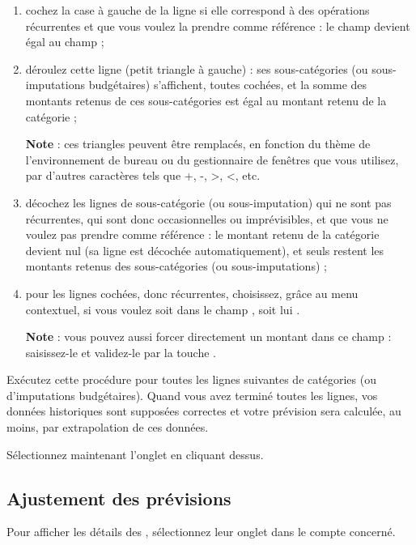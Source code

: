 \begin{enumerate}
	\item cochez la case à gauche de la ligne si elle correspond à des opérations récurrentes et que vous voulez la prendre comme référence : le champ  devient égal au champ  ;
	\item déroulez cette ligne (petit triangle à gauche) : ses sous-catégories (ou sous-imputations budgétaires) s'affichent, toutes cochées, et la somme des montants retenus de ces sous-catégories est égal au montant retenu de la catégorie ;

	\textbf{Note} : ces triangles peuvent être remplacés, en fonction du thème de l'environnement de bureau ou du gestionnaire de fenêtres que vous utilisez, par d'autres caractères tels que +, -, >, <, etc.
	
	\item décochez les lignes de sous-catégorie (ou sous-imputation) qui ne sont pas récurrentes, qui sont donc occasionnelles ou imprévisibles, et que vous ne voulez pas prendre comme référence : le montant retenu de la catégorie devient nul (sa ligne est décochée automatiquement), et seuls restent les montants retenus des sous-catégories (ou sous-imputations) ;
	\item pour les lignes cochées, donc récurrentes, choisissez, grâce au menu contextuel, si vous voulez soit  dans  le champ , soit lui . 

	\textbf{Note} :	vous pouvez aussi forcer directement un montant dans ce champ : saisissez-le et validez-le par la touche .
\end{enumerate}

Exécutez cette procédure pour toutes les lignes suivantes de catégories (ou d'imputations budgétaires). Quand vous avez terminé toutes les lignes, vos données historiques sont supposées correctes et votre prévision sera calculée, au moins, par extrapolation de ces données. 

Sélectionnez maintenant l'onglet  en cliquant dessus.


\subsection{Ajustement des prévisions\label{budget-create-adjust}}

Pour afficher les détails des , sélectionnez leur onglet  dans le compte concerné.

